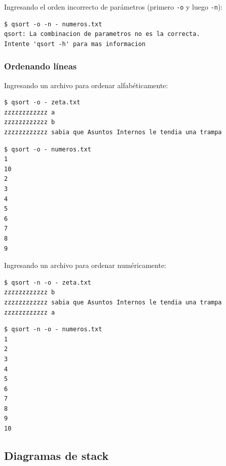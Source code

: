 \documentclass[a4paper, 12pt]{article}
\begin{document}
	Ingresando el orden incorrecto de parámetros (primero \texttt{-o} y luego \texttt{-n}):
	\begin{verbatim}
$ qsort -o -n - numeros.txt
qsort: La combinacion de parametros no es la correcta.
Intente 'qsort -h' para mas informacion
	\end{verbatim}
	
	
	
	\subsubsection{Ordenando líneas}
	Ingresando un archivo para ordenar alfabéticamente:
	\begin{verbatim}
$ qsort -o - zeta.txt
zzzzzzzzzzzz a
zzzzzzzzzzzz b
zzzzzzzzzzzz sabia que Asuntos Internos le tendia una trampa
	\end{verbatim}
	
	\begin{verbatim}
$ qsort -o - numeros.txt
1
10
2
3
4
5
6
7
8
9
	\end{verbatim}
	
	Ingresando un archivo para ordenar numéricamente:
	\begin{verbatim}
$ qsort -n -o - zeta.txt
zzzzzzzzzzzz b
zzzzzzzzzzzz sabia que Asuntos Internos le tendia una trampa
zzzzzzzzzzzz a
	\end{verbatim}
	
	\begin{verbatim}
$ qsort -n -o - numeros.txt
1
2
3
4
5
6
7
8
9
10
	\end{verbatim}

	\subsection{Diagramas de stack}
	
\end{document}
